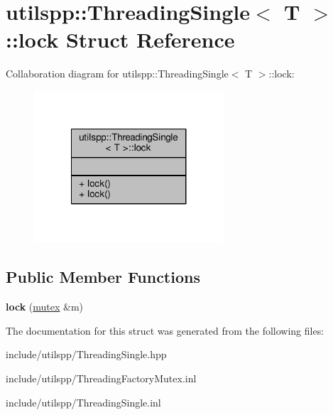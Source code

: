\hypertarget{structutilspp_1_1ThreadingSingle_1_1lock}{\section{utilspp\-:\-:Threading\-Single$<$ T $>$\-:\-:lock Struct Reference}
\label{structutilspp_1_1ThreadingSingle_1_1lock}
}


Collaboration diagram for utilspp\-:\-:Threading\-Single$<$ T $>$\-:\-:lock\-:\nopagebreak
\begin{figure}[H]
\begin{center}
\leavevmode
\includegraphics[width=200pt]{structutilspp_1_1ThreadingSingle_1_1lock__coll__graph}
\end{center}
\end{figure}
\subsection*{Public Member Functions}
\begin{DoxyCompactItemize}
\item 
\hypertarget{structutilspp_1_1ThreadingSingle_1_1lock_a9cf9076dcc163b0712120d016eb5b817}{{\bfseries lock} (\hyperlink{structutilspp_1_1ThreadingSingle_1_1mutex}{mutex} \&m)}\label{structutilspp_1_1ThreadingSingle_1_1lock_a9cf9076dcc163b0712120d016eb5b817}

\end{DoxyCompactItemize}


The documentation for this struct was generated from the following files\-:\begin{DoxyCompactItemize}
\item 
include/utilspp/Threading\-Single.\-hpp\item 
include/utilspp/Threading\-Factory\-Mutex.\-inl\item 
include/utilspp/Threading\-Single.\-inl\end{DoxyCompactItemize}
